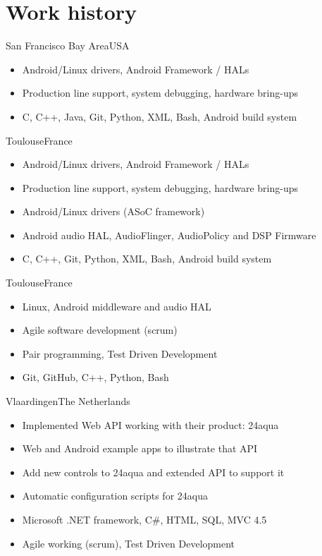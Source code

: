 \documentclass[a4paper,11pt]{moderncv}
\begin{document}
\section{Work history}
{San Francisco Bay Area}{USA}
{
    \begin{itemize}
        \item Android/Linux drivers, Android Framework / HALs
        \item Production line support, system debugging, hardware bring-ups
        \item C, C++, Java, Git, Python, XML, Bash, Android build system
    \end{itemize}
}

{Toulouse}{France}
{
    \begin{itemize}
        \item Android/Linux drivers, Android Framework / HALs
        \item Production line support, system debugging, hardware bring-ups
        \item Android/Linux drivers (ASoC framework)
        \item Android audio HAL, AudioFlinger, AudioPolicy and DSP Firmware
        \item C, C++, Git, Python, XML, Bash, Android build system
    \end{itemize}
}

{Toulouse}{France}
{
    \begin{itemize}
        \item Linux, Android middleware and audio HAL
        \item Agile software development (scrum)
        \item Pair programming, Test Driven Development
        \item Git, GitHub, C++, Python, Bash
    \end{itemize}
}

{Vlaardingen}{The Netherlands}
{
    \begin{itemize}
        \item Implemented Web API working with their product: 24aqua
        \item Web and Android example apps to illustrate that API
        \item Add new controls to 24aqua and extended API to support it
        \item Automatic configuration scripts for 24aqua
        \item Microsoft .NET framework, C\#, HTML, SQL, MVC 4.5
        \item Agile working (scrum), Test Driven Development
    \end{itemize}
}
\end{document}
